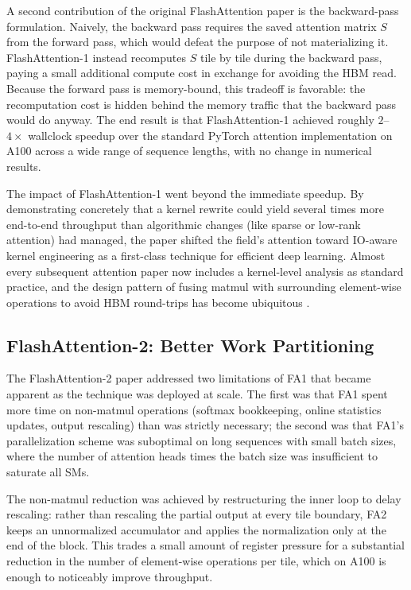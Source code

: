 \documentclass[10pt]{article}
\begin{document}
A second contribution of the original FlashAttention paper is the backward-pass formulation. Naively, the backward pass requires the saved attention matrix $S$ from the forward pass, which would defeat the purpose of not materializing it. FlashAttention-1 instead recomputes $S$ tile by tile during the backward pass, paying a small additional compute cost in exchange for avoiding the HBM read. Because the forward pass is memory-bound, this tradeoff is favorable: the recomputation cost is hidden behind the memory traffic that the backward pass would do anyway. The end result is that FlashAttention-1 achieved roughly $2$--$4\times$ wallclock speedup over the standard PyTorch attention implementation on A100 across a wide range of sequence lengths, with no change in numerical results.

The impact of FlashAttention-1 went beyond the immediate speedup. By demonstrating concretely that a kernel rewrite could yield several times more end-to-end throughput than algorithmic changes (like sparse or low-rank attention) had managed, the paper shifted the field's attention toward IO-aware kernel engineering as a first-class technique for efficient deep learning. Almost every subsequent attention paper now includes a kernel-level analysis as standard practice, and the design pattern of fusing matmul with surrounding element-wise operations to avoid HBM round-trips has become ubiquitous \citep{horace2023flash}.

\subsection{FlashAttention-2: Better Work Partitioning}
\label{sec:fa2}

The FlashAttention-2 paper \citep{dao2023flashattention2} addressed two limitations of FA1 that became apparent as the technique was deployed at scale. The first was that FA1 spent more time on non-matmul operations (softmax bookkeeping, online statistics updates, output rescaling) than was strictly necessary; the second was that FA1's parallelization scheme was suboptimal on long sequences with small batch sizes, where the number of attention heads times the batch size was insufficient to saturate all SMs.

The non-matmul reduction was achieved by restructuring the inner loop to delay rescaling: rather than rescaling the partial output at every tile boundary, FA2 keeps an unnormalized accumulator and applies the normalization only at the end of the block. This trades a small amount of register pressure for a substantial reduction in the number of element-wise operations per tile, which on A100 is enough to noticeably improve throughput.
\end{document}
